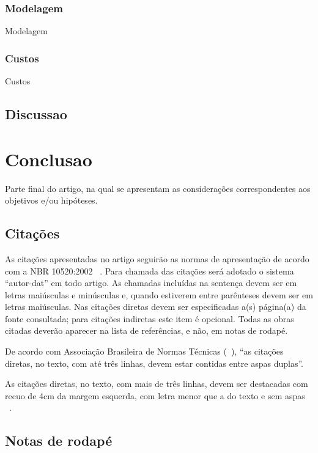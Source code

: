 \documentclass[article,a4paper,12pt,brazil,sumario=tradicional]{abntex2}
\renewenvironment{quotation}
  {\small\list{}{\rightmargin=0cm \leftmargin=2cm}%
   \item\relax}
  {\endlist}
\begin{document}
\subsubsection{Modelagem}


Modelagem

\subsubsection{Custos}

Custos

\subsection{Discussao}

\section{Conclusao}

Parte final do artigo, na qual se apresentam as considerações correspondentes aos objetivos e/ou hipóteses.

\subsection{Citações}

As citações apresentadas no artigo seguirão as normas de apresentação de acordo com a NBR 10520:2002 ~\cite{bibliografica6023}. Para chamada das citações será adotado o sistema ``autor-dat'' em todo artigo. As chamadas incluídas na sentença devem ser em letras maiúsculas e minúsculas e, quando estiverem entre parênteses devem ser em letras maiúsculas. Nas citações diretas devem ser especificadas a(s) página(a) da fonte consultada; para citações indiretas este item é opcional. Todas as obras citadas deverão aparecer na lista de referências, e não, em notas de rodapé.

De acordo com Associação Brasileira de Normas Técnicas (~\citeyear{bibliografica6023}), ``as citações diretas, no texto, com até três linhas, devem estar contidas entre aspas duplas''.

\begin{quotation}
\noindent
As citações diretas, no texto, com mais de três linhas, devem ser destacadas com recuo de 4cm da margem esquerda, com letra menor que a do texto e sem aspas ~\cite{bibliografica6023}.
\end{quotation}

\subsection{Notas de rodapé}
\end{document}
